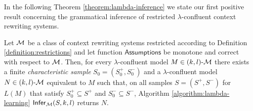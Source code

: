 In the following Theorem \ref{theorem:lambda-inference} we state our first positive result concerning the grammatical inference of restricted $\lambda$-confluent context rewriting systems.

\begin{theorem}\label{theorem:lambda-inference}
Let $\textup{\sf $\mathcal{M}$}$ be a class of context rewriting systems restricted according to Definition \ref{definition:restrictions} and let function $\mathsf{Assumptions}$ be monotone and correct with respect to $\textup{\sf $\mathcal{M}$}$. Then, for every $\lambda$-confluent model $M \in \textup{\sf $(k,l)$-\textup{\sf $\mathcal{M}$}}$ there exists a finite \emph{characteristic sample} $S_0 = (S_0^+, S_0^-)$ and a $\lambda$-confluent model $N \in \textup{\sf $(k,l)$-\textup{\sf $\mathcal{M}$}}$ equivalent to $M$ such that, on all samples $S = (S^+, S^-)$ for $L(M)$ that satisfy $S_0^+ \subseteq S^+$ and $S_0^- \subseteq S^-$, Algorithm \ref{algorithm:lambda-learning} $\mathsf{Infer}_{\textup{\sf $\mathcal{M}$}}(S, k, l)$ returns $N$.
\end{theorem}

